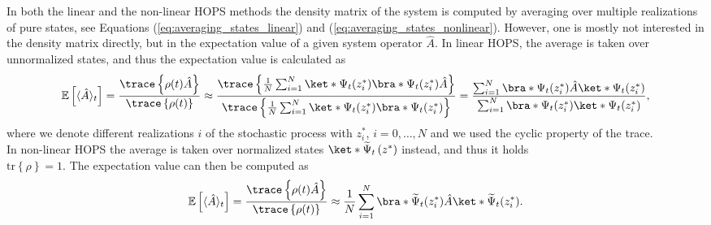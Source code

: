 In both the linear and the non-linear HOPS methods the density matrix of the system is computed by
averaging over multiple realizations of pure states, see Equations 
(\ref{eq:averaging_states_linear}) and (\ref{eq:averaging_states_nonlinear}).
However, one is mostly not interested in the density matrix directly, but in 
the expectation value of a given system operator $\hat{A}$. In linear HOPS, the average
is taken over unnormalized states, and thus the expectation value is calculated as
\begin{equation}
    \label{eq:stochastic_expectation_value_linear}
    \mathbb{E}\left[\langle\hat{A}\rangle_t\right]
    = \frac{\trace\left\{\rho(t)\hat{A}\right\}}{\trace\left\{\rho(t)\right\}}
    \approx \frac{\trace\left\{\frac{1}{N}\sum_{i=1}^{N}\ket*{\Psi_t(z^*_i)}\bra*{\Psi_t(z^*_i)}\hat{A}\right\}}
    {\trace\left\{\frac{1}{N}\sum_{i=1}^{N}\ket*{\Psi_t(z^*_i)}\bra*{\Psi_t(z^*_i)}\right\}}
    = \frac{\sum_{i=1}^{N}\bra*{\Psi_t(z^*_i)}\hat{A}\ket*{\Psi_t(z^*_i)}}
    {\sum_{i=1}^{N}\bra*{\Psi_t(z^*_i)}\ket*{\Psi_t(z^*_i)}},
\end{equation}
where we denote different realizations $i$ of the stochastic process with $z^*_i$, $i=0,\dots,N$ and we used the
cyclic property of the trace.
\\
In non-linear HOPS the average is taken over normalized states $\ket*{\widetilde{\Psi}_t\left(z^*\right)}$ instead,
and thus it holds \\
$\text{tr}\left\{\rho\right\} = 1$. The expectation value can then be
computed as
\begin{equation*}
    \mathbb{E}\left[\langle\hat{A}\rangle_t\right]
    = \frac{\trace\left\{\rho(t)\hat{A}\right\}}{\trace\left\{\rho(t)\right\}}
    \approx \frac{1}{N}\sum_{i=1}^{N} \bra*{\widetilde{\Psi}_t(z^*_i)} \hat{A} \ket*{\widetilde{\Psi}_t(z^*_i)}.
\end{equation*}